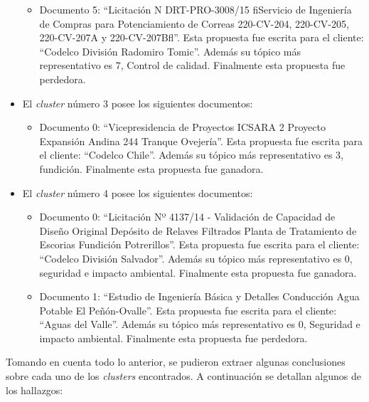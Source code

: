\begin{itemize}
\begin{itemize}
            \item Documento 5: ``Licitación N  DRT-PRO-3008/15 ﬁServicio de Ingeniería de Compras para Potenciamiento de Correas 220-CV-204, 220-CV-205, 220-CV-207A y 220-CV-207Bﬂ''. Esta propuesta fue escrita para el cliente: ``Codelco División Radomiro Tomic''. Además su tópico más representativo es 7, Control de calidad.
            Finalmente esta propuesta fue perdedora.
        \end{itemize}
        \item El \textit{cluster} número 3 posee los siguientes documentos:
        \begin{itemize}
            \item Documento 0: ``Vicepresidencia de Proyectos ICSARA 2 Proyecto Expansión Andina 244 Tranque Ovejería''. Esta propuesta fue escrita para el cliente: ``Codelco Chile''. Además su tópico más representativo es 3, fundición. Finalmente esta propuesta fue ganadora.
        \end{itemize}
        \item El \textit{cluster} número 4 posee los siguientes documentos:
        \begin{itemize}
            \item Documento 0: ``Licitación  Nº 4137/14 - Validación de Capacidad de Diseño Original Depósito de Relaves Filtrados Planta de Tratamiento de Escorias Fundición Potrerillos''. Esta propuesta fue escrita para el cliente: ``Codelco División Salvador''. Además su tópico más representativo es 0, seguridad e impacto ambiental. Finalmente esta propuesta fue ganadora.
            
            \item Documento 1: ``Estudio de Ingeniería Básica y Detalles Conducción Agua Potable El Peñón-Ovalle''. Esta propuesta fue escrita para el cliente: ``Aguas del Valle''. Además su tópico más representativo es 0, Seguridad e impacto ambiental. Finalmente esta propuesta fue perdedora.
        \end{itemize}
    \end{itemize}
    Tomando en cuenta todo lo anterior, se pudieron extraer algunas conclusiones sobre cada uno de los \textit{clusters} encontrados. A continuación se detallan algunos de los hallazgos:
    

